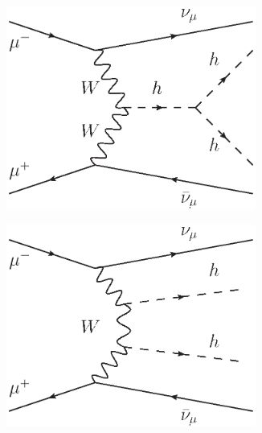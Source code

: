 \documentclass[12pt]{article}
\begin{document}
\begin{figure}[h]
	\centering
	\begin{subfigure}[b]{0.3\textwidth}
		\centering
		\includegraphics[width=0.9\textwidth]{diagram-trilin}
		\caption{}\label{subfig:diagram-trilin}
	\end{subfigure}
	\begin{subfigure}[b]{0.3\textwidth}
		\centering
		\includegraphics[width=0.9\textwidth]{diagram-radiation}
		\caption{}\label{subfig:diagram-radiation}
	\end{subfigure}
	\begin{subfigure}[b]{0.3\textwidth}
		\centering

\end{subfigure}
\end{figure}
\end{document}
